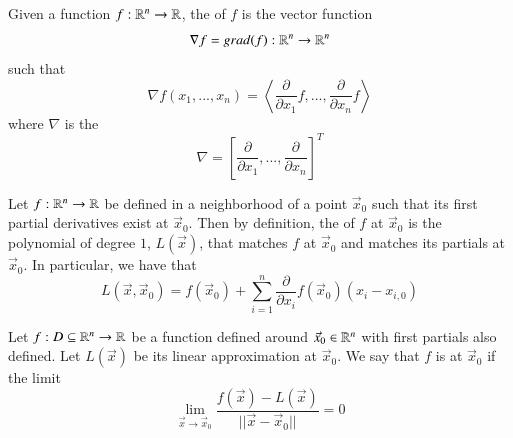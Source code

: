 \documentclass[12pt, a4paper, oneside, openright, titlepage]{book}
\begin{document}
\begin{appendices}
    \begin{defn}
        Given a function $f:\mathbb R^n\rightarrow \mathbb R$, the  of $f$ is the vector function \begin{equation}
            \nabla f = grad(f):\mathbb R^n\rightarrow\mathbb R^n
        \end{equation}
        such that \begin{equation}
            \nabla f(x_1,...,x_n) = \left\langle \frac{\partial}{\partial x_1}f,...,\frac{\partial}{\partial x_n}f\right\rangle
        \end{equation}
        where $\nabla$ is the  \begin{equation}
            \nabla = \left[\frac{\partial}{\partial x_1},...,\frac{\partial}{\partial x_n}\right]^T
        \end{equation}
    \end{defn}


    \begin{defn}
        Let $f:\mathbb R^n\rightarrow \mathbb R$ be defined in a neighborhood of a point $\vec{x}_0$ such that its first partial derivatives exist at $\vec{x}_0$. Then by definition, the  of $f$ at $\vec{x}_0$ is the polynomial of degree $1$, $L(\vec{x})$, that matches $f$ at $\vec{x}_0$ and matches its partials at $\vec{x}_0$. In particular, we have that \begin{equation}
            L(\vec{x},\vec{x}_0) = f(\vec{x}_0) + \sum_{i=1}^n \frac{\partial}{\partial x_i}f(\vec{x}_0)(x_i - x_{i,0})
        \end{equation}
    \end{defn}


    \begin{defn}
        Let $f:D\subseteq \mathbb R^n\rightarrow \mathbb R$ be a function defined around $\vec{x}_0 \in \mathbb R^n$ with first partials also defined. Let $L(\vec{x})$ be its linear approximation at $\vec{x}_0$. We say that $f$ is  at $\vec{x}_0$ if the limit \begin{equation}
            \lim_{\vec{x}\rightarrow \vec{x}_0} \frac{f(\vec{x}) - L(\vec{x})}{||\vec{x}-\vec{x}_0||} = 0
        \end{equation}
    \end{defn}



\end{appendices}
\end{document}
